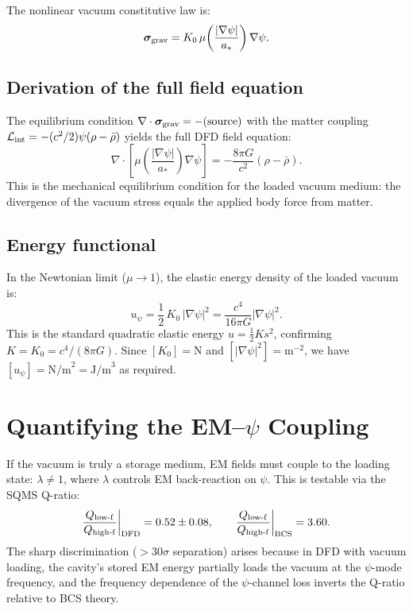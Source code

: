 \documentclass[aps,prd,twocolumn,superscriptaddress,nofootinbib]{revtex4-2}
\begin{document}
The nonlinear vacuum constitutive law is:
\begin{equation}
\bm{\sigma}_{\rm grav}
= K_0\,\mu\!\left(\frac{|\nabla\psi|}{a_*}\right)
\nabla\psi.
\label{eq:constitutive-nonlinear}
\end{equation}

\subsection{Derivation of the full field equation}

The equilibrium condition
$\nabla \cdot \bm{\sigma}_{\rm grav} = -(\text{source})$
with the matter coupling
$\mathcal{L}_{\rm int} = -(c^2/2)\psi(\rho - \bar\rho)$
yields the full DFD field equation:
\begin{equation}
\nabla\cdot\!\left[\mu\!\left(\frac{|\nabla\psi|}{a_*}\right)
\nabla\psi\right]
= -\frac{8\pi G}{c^2}(\rho - \bar\rho).
\label{eq:full-field}
\end{equation}
This is the mechanical equilibrium condition for the loaded vacuum
medium: the divergence of the vacuum stress equals the applied body
force from matter.

\subsection{Energy functional}

In the Newtonian limit ($\mu \to 1$), the elastic energy density of
the loaded vacuum is:
\begin{equation}
u_\psi = \frac{1}{2}\,K_0\,|\nabla\psi|^2
= \frac{c^4}{16\pi G}|\nabla\psi|^2.
\label{eq:energy-density}
\end{equation}
This is the standard quadratic elastic energy
$u = \frac{1}{2}K s^2$, confirming $K = K_0 = c^4/(8\pi G)$.
Since $[K_0] = \text{N}$ and $[|\nabla\psi|^2] = \text{m}^{-2}$,
we have $[u_\psi] = \text{N/m}^2 = \text{J/m}^3$ as required.


\section{Quantifying the EM--$\psi$ Coupling}
\label{sec:em-coupling}

If the vacuum is truly a storage medium, EM fields must couple to the
loading state: $\lambda \neq 1$, where $\lambda$ controls EM
back-reaction on $\psi$.  This is testable via the SQMS Q-ratio:
\begin{equation}
\frac{Q_{\rm low\text{-}f}}{Q_{\rm high\text{-}f}}\bigg|_{\rm DFD}
= 0.52 \pm 0.08,
\qquad
\frac{Q_{\rm low\text{-}f}}{Q_{\rm high\text{-}f}}\bigg|_{\rm BCS}
= 3.60.
\label{eq:Q-ratio}
\end{equation}
The sharp discrimination ($>30\sigma$ separation) arises because in
DFD with vacuum loading, the cavity's stored EM energy partially loads
the vacuum at the $\psi$-mode frequency, and the frequency dependence
of the $\psi$-channel loss inverts the Q-ratio relative to BCS theory.
\end{document}
